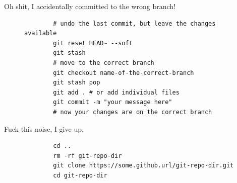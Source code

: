 \begin{frame}[fragile]{Oh shit, I accidentally committed to the wrong branch!}
    \begin{figure}
    \begin{lstlisting}
        # undo the last commit, but leave the changes available
        git reset HEAD~ --soft
        git stash
        # move to the correct branch
        git checkout name-of-the-correct-branch
        git stash pop
        git add . # or add individual files
        git commit -m "your message here"
        # now your changes are on the correct branch
        \end{lstlisting}
\end{figure}
\end{frame}

\begin{frame}[fragile]{Fuck this noise, I give up.}

    \begin{figure}
        \begin{lstlisting}
        cd ..
        rm -rf git-repo-dir
        git clone https://some.github.url/git-repo-dir.git
        cd git-repo-dir
        \end{lstlisting}
    \end{figure}
\end{frame}

